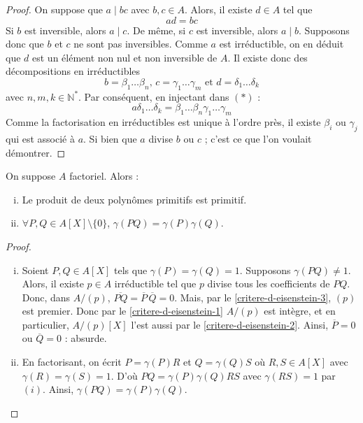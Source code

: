 	\begin{proof}
		On suppose que $a \mid bc$ avec $b, c \in A$. Alors, il existe $d \in A$ tel que
		\[ ad = bc \tag{$*$} \]
		Si $b$ est inversible, alors $a \mid c$. De même, si $c$ est inversible, alors $a \mid b$. Supposons donc que $b$ et $c$ ne sont pas inversibles. Comme $a$ est irréductible, on en déduit que $d$ est un élément non nul et non inversible de $A$. Il existe donc des décompositions en irréductibles
		\[ b = \beta_1 \dots \beta_n, \, c = \gamma_1 \dots \gamma_m \text{ et } d = \delta_1 \dots \delta_k \]
		avec $n, m, k \in \mathbb{N}^*$. Par conséquent, en injectant dans $(*)$ :
		\[ a \delta_1 \dots \delta_k = \beta_1 \dots \beta_n \gamma_1 \dots \gamma_m \]
		Comme la factorisation en irréductibles est unique à l'ordre près, il existe $\beta_i$ ou $\gamma_j$ qui est associé à $a$. Si bien que $a$ divise $b$ ou $c$ ; c'est ce que l'on voulait démontrer.
	\end{proof}


	\begin{lemma}[Gauss]
		\label{critere-d-eisenstein-4}
		On suppose $A$ factoriel. Alors :
		\begin{enumerate}[(i)]
			\item Le produit de deux polynômes primitifs est primitif.
			\item $\forall P, Q \in A[X] \setminus \{ 0 \}$, $\gamma(PQ) = \gamma(P) \gamma(Q)$.
		\end{enumerate}
	\end{lemma}

	\begin{proof}
		\begin{enumerate}[(i)]
			\item Soient $P, Q \in A[X]$ tels que $\gamma(P) = \gamma(Q) = 1$. Supposons $\gamma(PQ) \neq 1$. Alors, il existe $p \in A$ irréductible tel que $p$ divise tous les coefficients de $PQ$. Donc, dans $A/(p)$, $\overline{PQ} = \overline{P} \, \overline{Q} = 0$.
			\newpar
			Mais, par le \cref{critere-d-eisenstein-3}, $(p)$ est premier. Donc par le \cref{critere-d-eisenstein-1} $A/(p)$ est intègre, et en particulier, $A/(p)[X]$ l'est aussi par le \cref{critere-d-eisenstein-2}. Ainsi, $\overline{P} = 0$ ou $\overline{Q} = 0$ : absurde.
			\item En factorisant, on écrit $P = \gamma(P)R$ et $Q = \gamma(Q)S$ où $R, S \in A[X]$ avec $\gamma(R) = \gamma(S) = 1$. D'où $PQ = \gamma(P)\gamma(Q)RS$ avec $\gamma(RS) = 1$ par $(i)$. Ainsi, $\gamma(PQ) = \gamma(P) \gamma(Q).$
		\end{enumerate}
	\end{proof}

